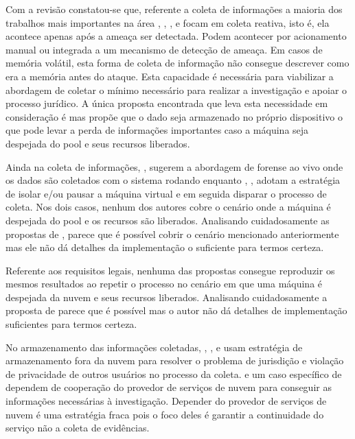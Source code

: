 \documentclass[12pt,				%
	openright,			%
	oneside,			%
	a4paper,			%
	english,			%
	brazil				%
	]{abntex2}
\begin{document}
Com a revisão constatou-se que, referente a coleta de informações a maioria dos trabalhos mais importantes na área \cite{Reichert2015}, \cite{Poisel2013}, \cite{Dykstra2013}, 
\cite{George2012} e \cite{Sang2013} focam em coleta reativa, isto é, ela acontece apenas após a ameaça ser detectada. Podem acontecer por acionamento manual ou integrada a um 
mecanismo de detecção de ameaça. Em casos de memória volátil, esta forma de coleta de informação não consegue descrever como era a memória antes do ataque. Esta capacidade é
necessária para viabilizar a abordagem de coletar o mínimo necessário para realizar a investigação e apoiar o processo jurídico. A única proposta encontrada que leva esta 
necessidade em consideração é \cite{Dezfouli2012} mas propõe que o dado seja armazenado no próprio dispositivo o que pode levar a perda de informações importantes caso a 
máquina seja despejada do pool e seus recursos liberados.

Ainda na coleta de informações, \cite{Reichert2015}, \cite{George2012} sugerem a abordagem de forense ao vivo onde os dados são coletados com o sistema rodando enquanto 
\cite{Poisel2013}, \cite{Dykstra2013}, \cite{Sang2013} adotam a estratégia de isolar e/ou pausar a máquina virtual e em seguida disparar o processo de coleta. Nos dois casos, 
nenhum dos autores cobre o cenário onde a máquina é despejada do pool e os recursos são liberados. Analisando cuidadosamente as propostas de \cite{Poisel2013}, parece que é possível
cobrir o cenário mencionado anteriormente mas ele não dá detalhes da implementação o suficiente para termos certeza.

Referente aos requisitos legais, nenhuma das propostas consegue reproduzir os mesmos resultados ao repetir o processo no cenário em que uma máquina é despejada da nuvem e seus 
recursos liberados. Analisando cuidadosamente a proposta de \cite{George2012} parece que é possível mas o autor não dá detalhes de implementação suficientes para termos certeza.

No armazenamento das informações coletadas, \cite{Reichert2015}, \cite{George2012}, \cite{Poisel2013} e \cite{Dykstra2013} usam estratégia de armazenamento fora da nuvem para 
resolver o problema de jurisdição e violação de privacidade de outros usuários no processo da coleta. \cite{Sang2013} e um caso específico de \cite{George2012} dependem de 
cooperação do provedor de serviços de nuvem para conseguir as informações necessárias à investigação. Depender do provedor de serviços de nuvem é uma estratégia fraca pois o foco
deles é garantir a continuidade do serviço não a coleta de evidências. 
\end{document}
